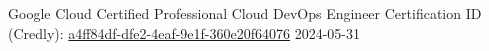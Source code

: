 \certificationitem
{Google Cloud Certified Professional Cloud DevOps Engineer}
{\companygoogle}
{Certification ID (Credly): \href{https://www.credly.com/badges/a4ff84df-dfe2-4eaf-9e1f-360e20f64076}{a4ff84df-dfe2-4eaf-9e1f-360e20f64076}}
{2024-05-31}